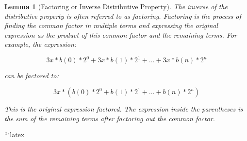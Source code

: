 \documentclass{article}
\newtheorem{lemma}{Lemma}
\begin{document}
    \begin{lemma}[Factoring or Inverse Distributive Property]
        The inverse of the distributive property is often referred to as factoring. Factoring is the process of finding the common factor in multiple terms and expressing the original expression as the product of this common factor and the remaining terms. For example, the expression:
        
        \[3x * b(0)*2^0 + 3x * b(1)*2^1 + \ldots + 3x * b(n)*2^n\]
        
        can be factored to:
        
        \[3x * (b(0)*2^0 + b(1)*2^1 + \ldots + b(n)*2^n)\]
        
        This is the original expression factored. The expression inside the parentheses is the sum of the remaining terms after factoring out the common factor.
        \end{lemma}
        



    ```latex
    
\end{document}
